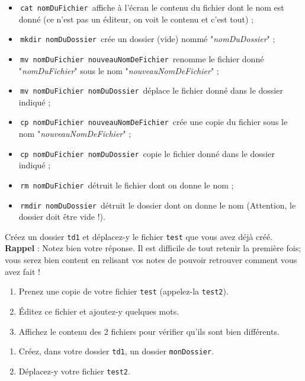 \documentclass[a4paper,11pt]{article}
\begin{document}
\begin{itemize}
\item \,\verb|cat nomDuFichier|\,
affiche \`a l'\'ecran le contenu du fichier dont le nom est donn\'e (ce n'est pas un \'editeur, on voit le contenu et c'est tout) ;
\item \,\verb|mkdir nomDuDossier|\, cr\'ee un dossier (vide) nomm\'e "\textit{nomDuDossier}" ;
\item \,\verb|mv nomDuFichier nouveauNomDeFichier|\, renomme le fichier donn\'e "\textit{nomDuFichier}" sous le nom "\textit{nouveauNomDeFichier}" ;
\item \,\verb|mv nomDuFichier nomDuDossier|\, d\'eplace le fichier donn\'e dans le dossier indiqu\'e ;
\item \,\verb|cp nomDuFichier nouveauNomDeFichier|\, cr\'ee une copie du fichier sous le nom "\textit{nouveauNomDeFichier}" ;
\item \,\verb|cp nomDuFichier nomDuDossier|\, copie le fichier donn\'e dans le dossier indiqu\'e ;
\item \,\verb|rm nomDuFichier|\, d\'etruit le fichier dont on donne le nom ;
\item \,\verb|rmdir nomDuDossier|\, d\'etruit le dossier dont on donne le nom (Attention, le dossier doit \^etre vide !).
\end{itemize}



\begin{Exercice}{}
Cr\'eez un dossier \verb_td1_ et d\'eplacez-y le fichier \verb_test_ que vous avez d\'ej\`a cr\'e\'e.\\
\textbf{Rappel} : Notez bien votre r\'eponse. Il est difficile de tout retenir la premi\`ere fois; vous serez bien content en relisant vos notes de pouvoir retrouver comment vous avez fait !
\end{Exercice}	
		
\begin{Exercice}{}
\begin{enumerate}
\item Prenez une copie de votre fichier \verb_test_ (appelez-la \verb_test2_).
\item \'Editez ce fichier et ajoutez-y quelques mots.
\item Affichez le contenu des 2 fichiers pour v\'erifier qu'ils sont bien diff\'erents.
\end{enumerate}
\end{Exercice}
				
\begin{Exercice}{}
\begin{enumerate}
\item Cr\'eez, dans votre dossier \verb_td1_, un dossier \verb_monDossier_.
\item D\'eplacez-y votre fichier \verb_test2_.
\end{enumerate}
\end{Exercice}	
\end{document}

